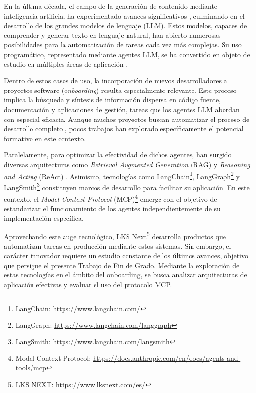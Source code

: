 En la última década, el campo de la generación de contenido mediante inteligencia artificial ha experimentado avances significativos \cite{vaswani_attention_2023}, culminando en el desarrollo de los grandes modelos de lenguaje (LLM). Estos modelos, capaces de comprender y generar texto en lenguaje natural, han abierto numerosas posibilidades para la automatización de tareas cada vez más complejas. Su uso programático, representado mediante agentes LLM, se ha convertido en objeto de estudio en múltiples áreas de aplicación \cite{noauthor_design_nodate, singh_exploring_2023, dong_self-collaboration_2024}.

Dentro de estos casos de uso, la incorporación de nuevos desarrolladores a proyectos software (\textit{onboarding}) resulta especialmente relevante. Este proceso implica la búsqueda y síntesis de información dispersa en código fuente, documentación y aplicaciones de gestión, tareas que los agentes LLM abordan con especial eficacia. Aunque muchos proyectos buscan automatizar el proceso de desarrollo completo \cite{qian_chatdev_2024, acharya_devin_2025, noauthor_aider-aiaider_2025}, pocos trabajos han explorado específicamente el potencial formativo en este contexto.

Paralelamente, para optimizar la efectividad de dichos agentes, han surgido diversas arquitecturas como \textit{Retrieval Augmented Generation} (RAG) \cite{gao_retrieval-augmented_2024} y \textit{Reasoning and Acting} (ReAct) \cite{yao_react_2023}. Asimismo, tecnologías como LangChain\footnote{LangChain: \url{https://www.langchain.com/}}, LangGraph\footnote{LangGraph: \url{https://www.langchain.com/langgraph}} y LangSmith\footnote{LangSmith: \url{https://www.langchain.com/langsmith}} constituyen marcos de desarrollo para facilitar su aplicación. En este contexto, el \textit{Model Context Protocol} (MCP)\footnote{Model Context Protocol: \url{https://docs.anthropic.com/en/docs/agents-and-tools/mcp}} emerge con el objetivo de estandarizar el funcionamiento de los agentes independientemente de su implementación específica.


Aprovechando este auge tecnológico, LKS Next\footnote{LKS NEXT: \url{https://www.lksnext.com/es/}} desarrolla productos que automatizan tareas en producción mediante estos sistemas. Sin embargo, el carácter innovador requiere un estudio constante de los últimos avances, objetivo que persigue el presente Trabajo de Fin de Grado. Mediante la exploración de estas tecnologías en el ámbito del onboarding, se busca analizar arquitecturas de aplicación efectivas y evaluar el uso del protocolo MCP.


